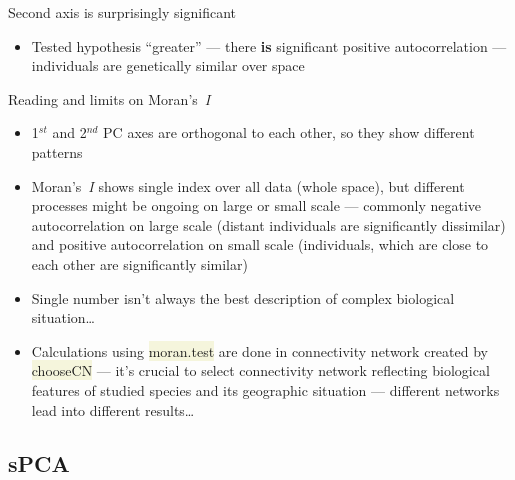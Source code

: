 \documentclass[compress, xelatex, 11pt, xcolor=svgnames, aspectratio=169,
	hyperref={
		bookmarks=true,
		unicode=true,
		colorlinks=true,
		pdftitle={Molecular data in R},
		plainpages=false,
		pdfauthor={Vojtech Zeisek},
		pdfsubject={Course about phylogeny and evolution in R},
		pdfcreator={XeLaTeX},
		pdfkeywords={R, evolution, phylogeny, molecular data},
		linkcolor=Crimson, %
		anchorcolor=Magenta, %
		citecolor=Magenta, %
		filecolor=Magenta, %
		menucolor=Magenta, %
		urlcolor=DodgerBlue, %
		},
	url={hyphens, lowtilde} %
	]{beamer}
\renewcommand{\texttt}[1]{\colorbox{Beige}{{\ttfamily #1}}}
\begin{document}
\begin{frame}{Second axis is surprisingly significant}
	\begin{center}
		\texttt{[image: moran2.png]}
	\end{center}
	\begin{itemize}
		\item Tested hypothesis \enquote{greater} --- there \textbf{is} significant positive autocorrelation --- individuals are genetically similar over space
	\end{itemize}
\end{frame}

\begin{frame}{Reading and limits on Moran's~\textit{I}}
	\begin{itemize}
		\item 1$^{st}$ and 2$^{nd}$ PC axes are orthogonal to each other, so they show different patterns
		\item Moran's~\textit{I} shows single index over all data (whole space), but different processes might be ongoing on large or small scale --- commonly negative autocorrelation on large scale (distant individuals are significantly dissimilar) and positive autocorrelation on small scale (individuals, which are close to each other are significantly similar)
		\item Single number isn't always the best description of complex biological situation\ldots
		\item Calculations using \texttt{moran.test} are done in connectivity network created by \texttt{chooseCN} --- it's crucial to select connectivity network reflecting biological features of studied species and its geographic situation --- different networks lead into different results\ldots
	\end{itemize}
\end{frame}

\subsection{sPCA}
\end{document}
